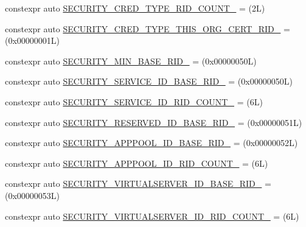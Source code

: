 \begin{DoxyCompactItemize}
\item 
constexpr auto \mbox{\hyperlink{namespaceboost_1_1winapi_a439bc83360948f7ed5edb2dfb0b3f25b}{S\+E\+C\+U\+R\+I\+T\+Y\+\_\+\+C\+R\+E\+D\+\_\+\+T\+Y\+P\+E\+\_\+\+R\+I\+D\+\_\+\+C\+O\+U\+N\+T\+\_\+}} = (2\+L)
\item 
constexpr auto \mbox{\hyperlink{namespaceboost_1_1winapi_aa04c61023a658db4cc5d474acbfa7764}{S\+E\+C\+U\+R\+I\+T\+Y\+\_\+\+C\+R\+E\+D\+\_\+\+T\+Y\+P\+E\+\_\+\+T\+H\+I\+S\+\_\+\+O\+R\+G\+\_\+\+C\+E\+R\+T\+\_\+\+R\+I\+D\+\_\+}} = (0x00000001\+L)
\item 
constexpr auto \mbox{\hyperlink{namespaceboost_1_1winapi_a02f7b9be1826baed86494e717b619999}{S\+E\+C\+U\+R\+I\+T\+Y\+\_\+\+M\+I\+N\+\_\+\+B\+A\+S\+E\+\_\+\+R\+I\+D\+\_\+}} = (0x00000050\+L)
\item 
constexpr auto \mbox{\hyperlink{namespaceboost_1_1winapi_a213d337649e8daab929541781dc28f2f}{S\+E\+C\+U\+R\+I\+T\+Y\+\_\+\+S\+E\+R\+V\+I\+C\+E\+\_\+\+I\+D\+\_\+\+B\+A\+S\+E\+\_\+\+R\+I\+D\+\_\+}} = (0x00000050\+L)
\item 
constexpr auto \mbox{\hyperlink{namespaceboost_1_1winapi_af8aeb332196cc857e5427616951f12f6}{S\+E\+C\+U\+R\+I\+T\+Y\+\_\+\+S\+E\+R\+V\+I\+C\+E\+\_\+\+I\+D\+\_\+\+R\+I\+D\+\_\+\+C\+O\+U\+N\+T\+\_\+}} = (6\+L)
\item 
constexpr auto \mbox{\hyperlink{namespaceboost_1_1winapi_acf9358ce97c70c4708333a1558eb889c}{S\+E\+C\+U\+R\+I\+T\+Y\+\_\+\+R\+E\+S\+E\+R\+V\+E\+D\+\_\+\+I\+D\+\_\+\+B\+A\+S\+E\+\_\+\+R\+I\+D\+\_\+}} = (0x00000051\+L)
\item 
constexpr auto \mbox{\hyperlink{namespaceboost_1_1winapi_a883309978a5caab8f9f954e183e73e0e}{S\+E\+C\+U\+R\+I\+T\+Y\+\_\+\+A\+P\+P\+P\+O\+O\+L\+\_\+\+I\+D\+\_\+\+B\+A\+S\+E\+\_\+\+R\+I\+D\+\_\+}} = (0x00000052\+L)
\item 
constexpr auto \mbox{\hyperlink{namespaceboost_1_1winapi_a6086228d63f5054030fa1272b4145a44}{S\+E\+C\+U\+R\+I\+T\+Y\+\_\+\+A\+P\+P\+P\+O\+O\+L\+\_\+\+I\+D\+\_\+\+R\+I\+D\+\_\+\+C\+O\+U\+N\+T\+\_\+}} = (6\+L)
\item 
constexpr auto \mbox{\hyperlink{namespaceboost_1_1winapi_a400f5b8fcbe4d99519112cf68d7ef058}{S\+E\+C\+U\+R\+I\+T\+Y\+\_\+\+V\+I\+R\+T\+U\+A\+L\+S\+E\+R\+V\+E\+R\+\_\+\+I\+D\+\_\+\+B\+A\+S\+E\+\_\+\+R\+I\+D\+\_\+}} = (0x00000053\+L)
\item 
constexpr auto \mbox{\hyperlink{namespaceboost_1_1winapi_aa6c80e1131825156d16fff9d93c2174e}{S\+E\+C\+U\+R\+I\+T\+Y\+\_\+\+V\+I\+R\+T\+U\+A\+L\+S\+E\+R\+V\+E\+R\+\_\+\+I\+D\+\_\+\+R\+I\+D\+\_\+\+C\+O\+U\+N\+T\+\_\+}} = (6\+L)

\end{DoxyCompactItemize}
